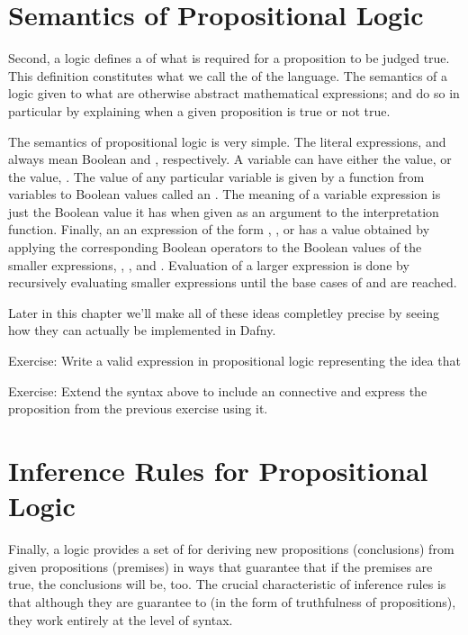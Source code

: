 \documentclass[letterpaper,10pt,english]{sphinxmanual}
\begin{document}
\section{Semantics of Propositional Logic}
\label{\detokenize{09-propositional-logic:semantics-of-propositional-logic}}
Second, a logic defines a of what is required for a proposition to be
judged true. This definition constitutes what we call the 
of the language. The semantics of a logic given  to what are
otherwise abstract mathematical expressions; and do so in particular
by explaining when a given proposition is true or not true.

The semantics of propositional logic is very simple. The literal
expressions,  and  always mean Boolean  and
, respectively. A variable can have either the value,  or
the value, . The value of any particular variable is given by a
function from variables to Boolean values called an .
The meaning of a variable expression is just the Boolean value it has
when given as an argument to the interpretation function. Finally, an
an expression of the form , , or  has a
value obtained by applying the corresponding Boolean operators to the
Boolean values of the smaller expressions, , , and .
Evaluation of a larger expression is done by recursively evaluating
smaller expressions until the base cases of  and  are
reached.

Later in this chapter we’ll make all of these ideas completley precise
by seeing how they can actually be implemented in Dafny.

Exercise: Write a valid expression in propositional logic representing
the idea that 

Exercise: Extend the syntax above to include an  connective
and express the proposition from the previous exercise using it.


\section{Inference Rules for Propositional Logic}
\label{\detokenize{09-propositional-logic:inference-rules-for-propositional-logic}}
Finally, a logic provides a set of  for deriving new
propositions (conclusions) from given propositions (premises) in ways
that guarantee that if the premises are true, the conclusions will be,
too. The crucial characteristic of inference rules is that although
they are guarantee to  (in the form of truthfulness
of propositions), they work entirely at the level of syntax.
\end{document}
